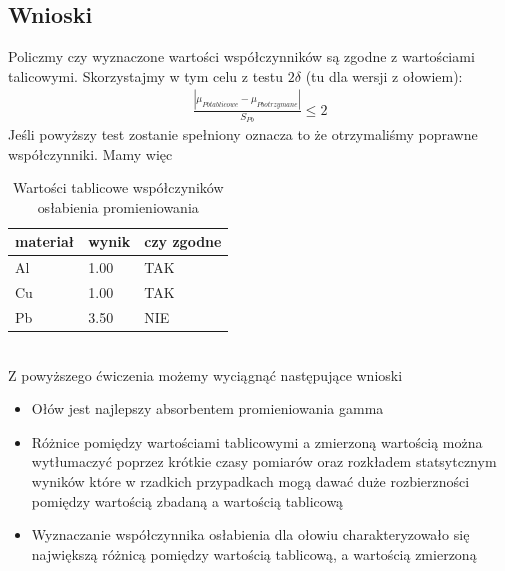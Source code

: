 \documentclass[a4paper]{article}
\newlength{\du}
\begin{document}
\subsection{Wnioski}
Policzmy czy wyznaczone wartości współczynników są zgodne z wartościami talicowymi. Skorzystajmy w tym celu z testu $2\delta$ (tu dla wersji z ołowiem):
\begin{align*}
\frac{|\mu_{Pb tablicowe} - \mu_{Pb otrzymane}|}{S_{Pb}} \leq 2
\end{align*}
Jeśli powyższy test zostanie spełniony oznacza to że otrzymaliśmy poprawne współczynniki.
Mamy więc \\
\begin{table}[h!]
\centering
\begin{tabular}{ | l | l | l | }
\hline
materiał & wynik & czy zgodne \\ \hline
Al & 1.00 & TAK \\ \hline  
Cu & 1.00 & TAK \\ \hline  
Pb & 3.50 & NIE \\ \hline  
\end{tabular}
\caption{Wartości tablicowe współczyników osłabienia promieniowania}
\label{pomiary_sruba}
\end{table}\\
Z powyższego ćwiczenia możemy wyciągnąć następujące wnioski
\begin{itemize}
\item Ołów jest najlepszy absorbentem promieniowania gamma
\item Różnice pomiędzy wartościami tablicowymi a zmierzoną wartością można wytłumaczyć poprzez krótkie czasy pomiarów oraz rozkładem statsytcznym wyników które w rzadkich przypadkach mogą dawać duże rozbierzności pomiędzy wartością zbadaną a wartością tablicową
\item Wyznaczanie współczynnika osłabienia dla ołowiu charakteryzowało się największą różnicą pomiędzy wartością tablicową, a wartością zmierzoną
\end{itemize}
\end{document}
